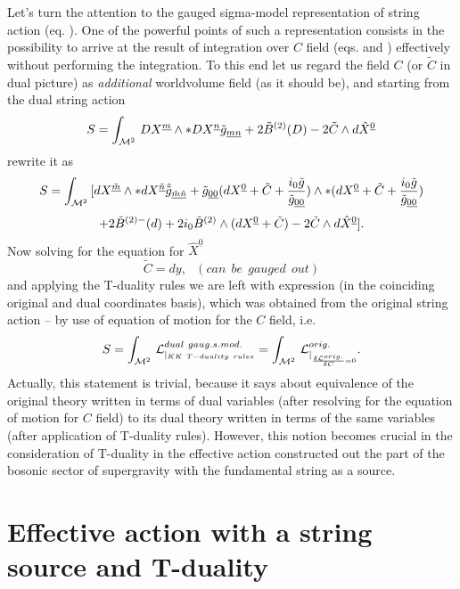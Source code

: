 \documentclass[a4paper,11pt]{article}
\begin{document}
Let's turn the attention to the gauged sigma-model representation of string
action (eq. ). One of the powerful points of such a representation
consists in the possibility to arrive at the result of integration over
$C$ field (eqs.  and ) effectively without performing the
integration. To this end let us regard the field $C$ (or ${\tilde C}$ in dual
picture) as {\it additional} worldvolume field (as it should be),
and starting from the dual string action
\begin{equation}\plabel{SDd}
S=\int_{{\cal M}^2}\, DX^{\underline m}\wedge \ast DX^{\underline n}
{\tilde g}_{\underline{m}\underline{n}}+2{\tilde B}^{(2)}(D)
-2{\tilde C}\wedge d{\hat X}^{\underline 0}
\end{equation}
rewrite it as
$$
S=\int_{{\cal M}^2}\, [dX^{\underline{\tilde m}}\wedge \ast
dX^{\underline{\tilde n}}
\hat{\tilde g}_{\underline{\tilde m}\underline{\tilde n}}
+{\tilde g}_{\underline{00}}(dX^{\underline 0}+{\tilde C}
+{i_0 {\tilde g}\over {\tilde g}_{\underline{00}}})\wedge \ast
(dX^{\underline 0}+{\tilde C}
+{i_0 {\tilde g}\over {\tilde g}_{\underline{00}}})
$$
\begin{equation}\plabel{SDd1}
+2{\tilde B}^{(2)-}(d)+2i_0 {\tilde B}^{(2)}\wedge (dX^{\underline 0}+
{\tilde C})-2{\tilde C}\wedge d{\hat X}^{\underline 0}].
\end{equation}
Now solving for the equation for ${\hat X}^{\underline 0}$
$$
{\tilde C}=dy,~~~(can~~be~~gauged~~out)
$$
and applying the T-duality rules  we are left with expression 
(in the coinciding original and dual coordinates basis), which was obtained 
from the original string action -- by use of 
equation of motion for the $C$ field, i.e.
\begin{equation}\plabel{conn}
S=\int_{{\cal M}^2}\,
{\cal L}^{dual~gaug.s.mod.}_{\vert_{KK~ T-duality~ rules}}
=\int_{{\cal M}^2}\, {\cal L}^{orig.}
_{\vert_{{\d {\cal L}^{orig.}\over \d C}=0}}.
\end{equation}
Actually, this statement is trivial, because it says about equivalence of
the original theory written in terms of dual variables (after resolving for the
equation of motion for $C$ field) to its dual theory written in
terms of the same variables (after application of T-duality rules).  However,
this notion becomes crucial in the consideration of T-duality in the
effective action constructed out the part of the bosonic sector of supergravity
with the fundamental string as a source.


\section{Effective action with a string source and
T-duality}
\end{document}
